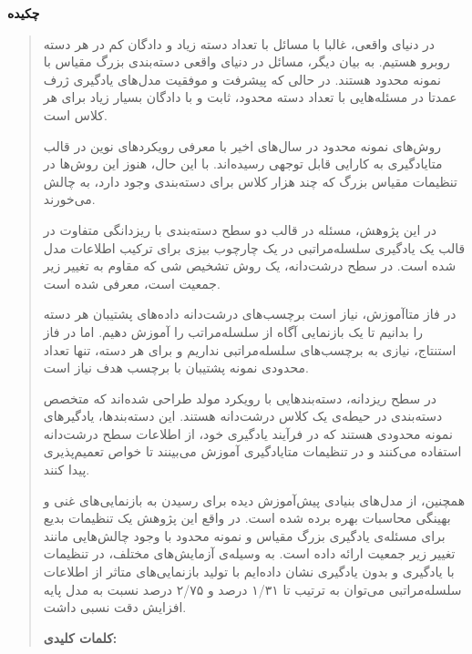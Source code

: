 \thispagestyle{empty}
\centerline{\textbf{\large{چکیده}}}
\begin{quote}
	در دنیای واقعی، غالبا با مسائل با تعداد دسته زیاد و دادگان کم در هر دسته روبرو هستیم. به بیان دیگر، مسائل در دنیای واقعی دسته‌بندی بزرگ مقیاس با نمونه محدود هستند.
در حالی که پیشرفت و موفقیت مدل‌های یادگیری ژرف عمدتا در مسئله‌هایی با تعداد دسته محدود، ثابت و با دادگان بسیار زیاد برای هر کلاس است. 

روش‌های نمونه محدود در سال‌های اخیر با معرفی رویکردهای نوین در قالب متایادگیری به کارایی قابل توجهی رسیده‌اند. با این حال، هنوز این روش‌ها در تنظیمات مقیاس بزرگ که چند هزار کلاس برای دسته‌بندی وجود دارد، به چالش می‌خورند.

در این پژوهش، مسئله در قالب دو سطح دسته‌بندی با ریزدانگی متفاوت در قالب یک یادگیری سلسله‌مراتبی در یک چارچوب بیزی برای ترکیب اطلاعات مدل شده است. در سطح درشت‌دانه، یک روش تشخیص شی که مقاوم به تغییر زیر جمعیت است، معرفی شده است. 

در فاز متاآموزش، نیاز است برچسب‌های درشت‌دانه داده‌های پشتیبان هر دسته را بدانیم تا یک بازنمایی آگاه از سلسله‌مراتب را آموزش دهیم. اما در فاز استنتاج، نیازی به برچسب‌های سلسله‌مراتبی نداریم و برای هر دسته، تنها تعداد محدودی نمونه پشتیبان با برچسب هدف نیاز است.

در سطح ریزدانه، دسته‌بندهایی با رویکرد مولد طراحی شده‌اند که متخصص دسته‌بندی در حیطه‌ی یک کلاس درشت‌دانه هستند. این دسته‌بندها، یادگیرهای نمونه محدودی هستند که در فرآیند یادگیری خود، از اطلاعات سطح درشت‌دانه استفاده می‌کنند و در تنظیمات متایادگیری آموزش می‌بینند تا خواص تعمیم‌پذیری پیدا کنند.

همچنین، از مدل‌های بنیادی پیش‌آموزش دیده برای رسیدن به بازنمایی‌های غنی و بهینگی محاسبات بهره برده شده است. در واقع این پژوهش یک تنظیمات بدیع برای مسئله‌ی یادگیری بزرگ مقیاس و نمونه محدود با وجود چالش‌هایی مانند تغییر زیر جمعیت ارائه داده است. به وسیله‌ی آزمایش‌های مختلف، در تنظیمات با یادگیری و بدون یادگیری نشان داده‌ایم با تولید بازنمایی‌های متاثر از اطلاعات سلسله‌مراتبی می‌توان به ترتیب تا ۱/۳۱ درصد و ۲/۷۵ درصد نسبت به مدل پایه افزایش دقت نسبی داشت.

\vskip 1cm
\textbf{کلمات کلیدی:} 
\end{quote}